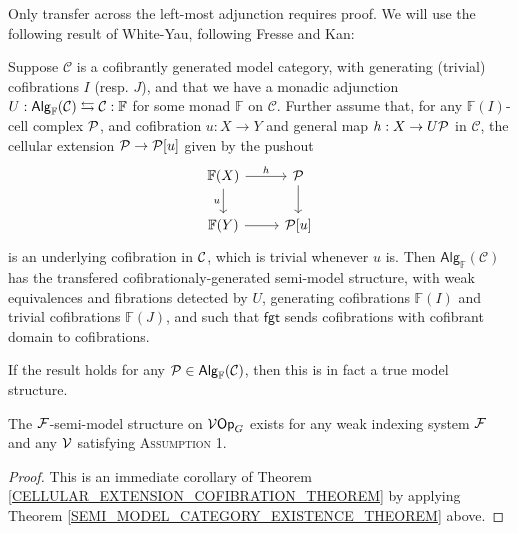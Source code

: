 \documentclass[a4paper,10pt]{article}%
\begin{document}
Only transfer across the left-most adjunction requires proof. We will use the following result of White-Yau, following Fresse and Kan:
\begin{theorem}
  [{\cite[Theorem 2.2.2]{WY15}}]
  \label{SEMI_MODEL_CATEGORY_EXISTENCE_THEOREM}
  Suppose $\mathcal C$ is a cofibrantly generated model category, with generating (trivial) cofibrations $I$ (resp. $J$), and that we have a monadic adjunction $U: \mathsf{Alg}_{\mathbb F}(\mathcal C) \leftrightarrows \C: \mathbb F$ for some monad $\mathbb F$ on $\mathcal C$. Further assume that, for any $\mathbb F(I)$-cell complex $\P$, and cofibration $u: X \to Y$ and general map $h: X \to U\P$ in $\mathcal C$, the cellular extension $\P \to \P[u]$ given by the pushout
\[
\begin{tikzcd}
  \mathbb F(X) \arrow[d, "u"'] \arrow[r, "h"] & \P \arrow[d] \\
  \mathbb F(Y) \arrow[r] & \P[u]
\end{tikzcd}
\]
is an underlying cofibration in $\C$, which is trivial whenever $u$ is. Then $\mathsf{Alg}_{\mathbb F}(\mathcal C)$ has the transfered cofibrationaly-generated semi-model structure, with weak equivalences and fibrations detected by $U$, generating cofibrations $\mathbb F(I)$ and trivial cofibrations $\mathbb F(J)$, and such that $\mathsf{fgt}$ sends cofibrations with cofibrant domain to cofibrations.

If the result holds for any $\P\in \mathsf{Alg}_{\mathbb F}(\mathcal C)$, then this is in fact a true model structure.
\end{theorem}

\begin{theorem}
  The $\F$-semi-model structure on $\V\Op_G$ exists for any weak indexing system $\F$ and any $\V$ satisfying \textsc{Assumption 1}.
\end{theorem}
\begin{proof}
  This is an immediate corollary of Theorem \ref{CELLULAR_EXTENSION_COFIBRATION_THEOREM} by applying Theorem \ref{SEMI_MODEL_CATEGORY_EXISTENCE_THEOREM} above.
\end{proof}
\end{document}
